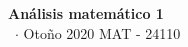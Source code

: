\documentclass[8pt,a4paper]{extarticle}
\renewcommand{\csClass}{Análisis matemático 1}
\renewcommand{\csClassCode}{MAT - 24110}
\renewcommand{\csTerm}{Otoño 2020}
\begin{document}
\begin{titlepage}
    \begin{center}
        \vspace*{1cm}
        \Huge
        \textbf{\csClass}
        \vspace{0.5cm} \\
        \Large
        \cs\ $\cdot$ \csTerm
        \vfill
        \csAuthorName
        \vspace{0.8cm}
        \csClassCode\\
        \csSchool
    \end{center}
\end{titlepage}

\begin{multicols}{3}
    \setcounter{page}{1}

    \vfill\eject
    \columnbreak
\end{multicols}
\end{document}
